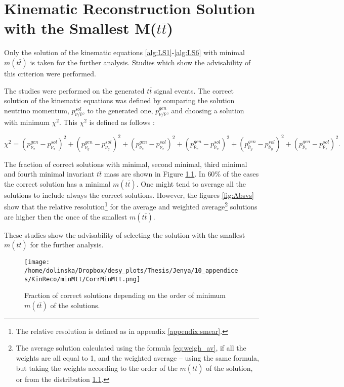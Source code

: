 \chapter{Kinematic Reconstruction Solution with the Smallest M($t\bar{t}$)}\label{appendix:mtt}

Only the solution of the kinematic equations \ref{alg:LS1}-\ref{alg:LS6} with minimal $m(t\bar{t})$ is taken for the further analysis.
Studies which show the advisability of this criterion were performed.

The studies were performed on the generated $t\bar{t}$ signal events. The correct solution of the kinematic equations was defined by comparing the 
solution neutrino momentum, $p_{\nu/\bar{\nu}}^{sol}$, to the generated one, $p_{\nu/\bar{\nu}}^{gen}$,  and choosing a solution with minimum $\chi^{2}$.
This $\chi^{2}$ is defined as follows \cite{Sonnenschein:2005ed}:

\begin{equation}
 \chi^{2} = (p_{\nu_{x}}^{gen} - p_{\nu_{x}}^{sol})^{2} + (p_{\nu_{y}}^{gen} - p_{\nu_{y}}^{sol})^{2} + (p_{\nu_{z}}^{gen} - p_{\nu_{z}}^{sol})^{2} + (p_{\bar{\nu}_{x}}^{gen} - p_{\bar{\nu}_{x}}^{sol})^{2} +
 (p_{\bar{\nu}_{y}}^{gen} - p_{\bar{\nu}_{y}}^{sol})^{2} + (p_{\bar{\nu}_{z}}^{gen} - p_{\bar{\nu}_{z}}^{sol})^{2}.
\end{equation}

The fraction of correct solutions with minimal, second minimal, third minimal and fourth minimal invariant $t\bar{t}$ mass are shown in Figure \ref{fig:corrMinMtt}. In $60\%$ of 
the cases the correct solution has a minimal $m(t\bar{t})$. One might tend to average all the solutions to include always the correct solutions. However, the figures \ref{fig:Absvs}
show that the relative resolution\footnote{The relative resolution is defined as in appendix \ref{appendix:smear}.} for the average and weighted average\footnote{The average 
solution calculated using the formula \ref{eq:weigh_av}, if all the weights are all equal to 1, and the weighted average -- using the same formula, but taking the weights according 
to the order of the $m(t\bar{t})$ of the solution, or from the distribution \ref{fig:corrMinMtt}.} solutions are higher then the once
of the smallest $m(t\bar{t})$.

These studies show the advisability of selecting the
solution with the smallest $m(t\bar{t})$ for the further analysis.

\begin{figure}[t]
  \centering
  \texttt{[image: /home/dolinska/Dropbox/desy\_plots/Thesis/Jenya/10\_appendices/KinReco/minMtt/CorrMinMtt.png]}
  \caption{Fraction of correct solutions depending on the order of minimum $m(t\bar{t})$ of the solutions.}
  \label{fig:corrMinMtt}
\end{figure}

